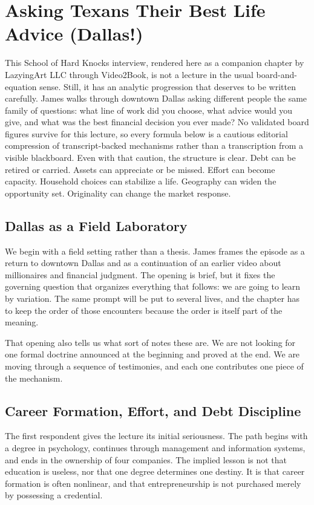 \chapter{Asking Texans Their Best Life Advice (Dallas!)}

This School of Hard Knocks interview, rendered here as a companion chapter by LazyingArt LLC through Video2Book, is not a lecture in the usual board-and-equation sense. Still, it has an analytic progression that deserves to be written carefully. James walks through downtown Dallas asking different people the same family of questions: what line of work did you choose, what advice would you give, and what was the best financial decision you ever made? No validated board figures survive for this lecture, so every formula below is a cautious editorial compression of transcript-backed mechanisms rather than a transcription from a visible blackboard. Even with that caution, the structure is clear. Debt can be retired or carried. Assets can appreciate or be missed. Effort can become capacity. Household choices can stabilize a life. Geography can widen the opportunity set. Originality can change the market response.

\section{Dallas as a Field Laboratory}

We begin with a field setting rather than a thesis. James frames the episode as a return to downtown Dallas and as a continuation of an earlier video about millionaires and financial judgment. The opening is brief, but it fixes the governing question that organizes everything that follows: we are going to learn by variation. The same prompt will be put to several lives, and the chapter has to keep the order of those encounters because the order is itself part of the meaning.

That opening also tells us what sort of notes these are. We are not looking for one formal doctrine announced at the beginning and proved at the end. We are moving through a sequence of testimonies, and each one contributes one piece of the mechanism.

\section{Career Formation, Effort, and Debt Discipline}

The first respondent gives the lecture its initial seriousness. The path begins with a degree in psychology, continues through management and information systems, and ends in the ownership of four companies. The implied lesson is not that education is useless, nor that one degree determines one destiny. It is that career formation is often nonlinear, and that entrepreneurship is not purchased merely by possessing a credential.

